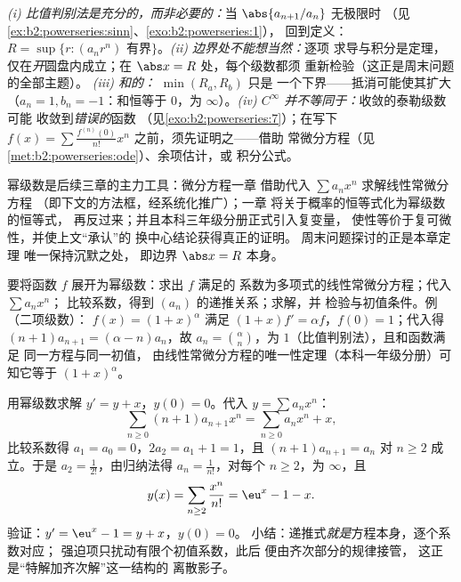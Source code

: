 \begin{remark}[常见误区]
\emph{(i) 比值判别法是充分的，而非必要的：}当
$\abs{a_{n+1}/a_n}$ 无极限时
（见\cref{ex:b2:powerseries:sinn}、\cref{exo:b2:powerseries:1}），
回到定义：$R = \sup\{r : (a_nr^n)$
有界$\}$。\emph{(ii) 边界处不能想当然：}逐项
求导与积分是定理，
仅在\emph{开}圆盘内成立；在 $\abs x = R$ 处，每个级数都须
重新检验（这正是周末问题的全部主题）。
\emph{(iii) 和的：} $\min(R_a, R_b)$ 只是
一个下界——抵消可能使其扩大（$a_n = 1,
b_n = -1$：和恒等于 $0$，为 $\infty$）。\emph{(iv)
$C^\infty$ 并不等同于：}收敛的泰勒级数可能
收敛到\emph{错误的}函数
（见\cref{exo:b2:powerseries:7}）；在写下 $f(x) = \sum
\frac{f^{(n)}(0)}{n!}x^n$ 之前，须先证明之——借助
常微分方程（见\cref{met:b2:powerseries:ode}）、余项估计，或
积分公式。
\end{remark}

\begin{remark}[应用]
幂级数是后续三章的主力工具：微分方程一章
借助代入 $\sum a_nx^n$ 求解线性常微分方程
（即下文的方法框，经系统化推广）；一章
将关于概率的恒等式化为幂级数的恒等式，
再反过来；并且本科三年级分册正式引入复变量，
使性等价于复可微性，并使上文“承认”的
换中心结论获得真正的证明。
周末问题探讨的正是本章定理
唯一保持沉默之处，
即边界 $\abs x = R$ 本身。
\end{remark}

\begin{method}[借助微分方程展开]\label{met:b2:powerseries:ode}
要将函数 $f$ 展开为幂级数：求出 $f$ 满足的
系数为多项式的线性常微分方程；代入 $\sum a_nx^n$；
比较系数，得到 $(a_n)$ 的递推关系；求解，并
检验与初值条件。例（二项级数）：
$f(x) = (1+x)^\alpha$ 满足 $(1+x)f' = \alpha f$，$f(0)
= 1$；代入得 $(n+1)a_{n+1} = (\alpha - n)a_n$，故 $a_n =
\binom{\alpha}{n}$，为 $1$（比值判别法），且和函数满足
同一方程与同一初值，
由线性常微分方程的唯一性定理（本科一年级分册）可知它等于 $(1 + x)^\alpha$。
\end{method}

\begin{example}[含强迫项方程的方法]\label{ex:b2:powerseries:odeforced}
用幂级数求解 $y' = y + x$，$y(0) = 0$。代入 $y =
\sum a_nx^n$：
\[
\sum_{n\geq0}(n+1)a_{n+1}x^n
= \sum_{n\geq0}a_nx^n + x ,
\]
比较系数得 $a_1 = a_0 = 0$，$2a_2 = a_1 + 1
= 1$，且 $(n+1)a_{n+1} = a_n$ 对 $n \geq 2$ 成立。于是 $a_2 =
\frac{1}{2!}$，由归纳法得 $a_n = \frac{1}{n!}$，对每个
$n \geq 2$，为 $\infty$，且
\[
y(x) = \sum_{n\geq2}\frac{x^n}{n!} = \eu^x - 1 - x .
\]
验证：$y' = \eu^x - 1 = y + x$，$y(0) = 0$。
小结：递推式\emph{就是}方程本身，逐个系数对应；
强迫项只扰动有限个初值系数，此后
便由齐次部分的规律接管，
这正是“特解加齐次解”这一结构的
离散影子。
\end{example}

